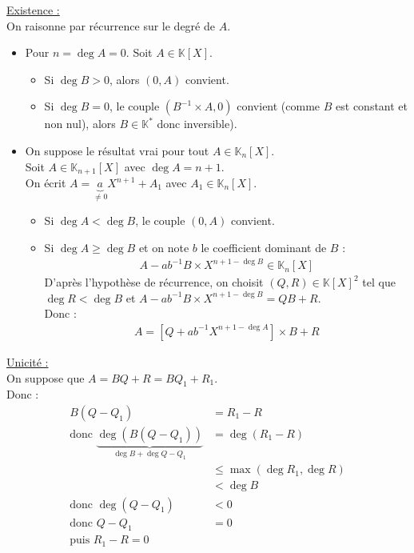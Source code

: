 \documentclass[titlepage, twoside]{report}
\begin{document}
\noindent \underline{Existence :} \\
On raisonne par récurrence sur le degré de $A$. \\
\begin{itemize}
    \item Pour $n = \deg A = 0$. Soit $A \in \mathbb{K}[X]$.
    \begin{itemize}
        \item Si $\deg B > 0$, alors $(0, A)$ convient. \\
        \item Si $\deg B = 0$, le couple $(B^{-1} \times A, 0)$ convient (comme $B$ est constant et non nul), alors $B \in \mathbb{K}^*$ donc inversible). \\
    \end{itemize}

    \item On suppose le résultat vrai pour tout $A \in \mathbb{K}_n[X]$. \\
    Soit $A \in \mathbb{K}_{n+1}[X]$ avec $\deg A = n+1$. \\
    On écrit $A = \underbrace{a}_{\neq 0} X^{n+1} + A_1$ avec $A_1 \in \mathbb{K}_n[X]$. 
    \begin{itemize}
        \item Si $\deg A < \deg B$, le couple $(0, A)$ convient. 
        \item Si $\deg A \geq \deg B$ et on note $b$ le coefficient dominant de $B$ : 
        \begin{align*}
            A - ab^{-1} B \times X^{n+1 - \deg B} \in \mathbb{K}_n[X]
        \end{align*}
        D'après l'hypothèse de récurrence, on choisit $(Q, R) \in \mathbb{K}[X]^2$ tel que $\deg R < \deg B$ et $A - ab^{-1} B \times X^{n+1 - \deg B} = QB + R$. \\
        Donc : 
        \begin{align*}
            A = \left[ Q + ab^{-1}X^{n+1 - \deg A} \right] \times B + R
        \end{align*}
    \end{itemize}
\end{itemize}

\noindent\underline{Unicité :} \\
On suppose que $A = BQ + R = BQ_1 + R_1$. \\
Donc : 
\begin{align*}
    B(Q - Q_1) &= R_1 - R \\
    \text{donc } \underbrace{\deg{(B(Q - Q_1))}}_{\deg{B} + \deg{Q - Q_1}} &= \deg{(R_1 - R)} \\
    &\leq \max(\deg{R_1}, \deg{R}) \\
    &< \deg{B} \\
    \text{donc } \deg{(Q - Q_1)} &< 0 \\
    \text{donc } Q - Q_1 &= 0 \\
    \text{puis } R_1 - R = 0
\end{align*}
\end{document}
